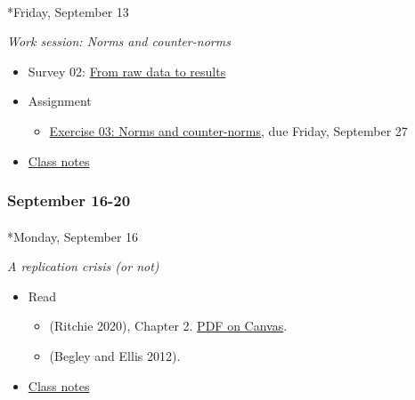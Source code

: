 \documentclass[
  letterpaper,
  DIV=11,
  numbers=noendperiod]{scrartcl}
\makeatletter
\let\oldparagraph\paragraph
\renewcommand{\paragraph}{
    \@ifstar
      \xxxParagraphStar
      \xxxParagraphNoStar
  }
\newcommand{\xxxParagraphStar}[1]{\oldparagraph*{#1}\mbox{}}
\newcommand{\xxxParagraphNoStar}[1]{\oldparagraph{#1}\mbox{}}
\providecommand{\tightlist}{%
  \setlength{\itemsep}{0pt}\setlength{\parskip}{0pt}}\usepackage{longtable,booktabs,array}
\makeatother
\begin{document}
\paragraph*{Friday, September 13}\label{friday-september-13}

\emph{Work session: Norms and counter-norms}

\begin{itemize}
\tightlist
\item
  Survey 02: \href{surveys/survey-02.qmd}{From raw data to results}
\item
  {Assignment}

  \begin{itemize}
  \tightlist
  \item
    \href{exercises/ex03-norms-counternorms.qmd}{Exercise 03: Norms and
    counter-norms}, {due Friday, September 27}
  \end{itemize}
\item
  \href{notes/wk03-2024-09-13-work-session-norms.qmd}{Class notes}
\end{itemize}

\subsubsection*{September 16-20}\label{week-04}

\paragraph*{Monday, September 16}\label{monday-september-16}

\emph{A replication crisis (or not)}

\begin{itemize}
\tightlist
\item
  Read

  \begin{itemize}
  \tightlist
  \item
    (Ritchie 2020), Chapter 2.
    \href{https://psu.instructure.com/courses/2350148/files/folder/readings?preview=165170706}{PDF
    on Canvas}.
  \item
    (Begley and Ellis 2012).
  \end{itemize}
\item
  \href{notes/wk04-2024-09-16-replication-crisis.qmd}{Class notes}
\end{itemize}
\end{document}
